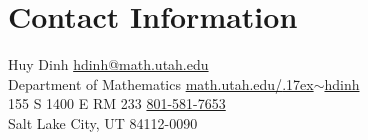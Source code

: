 \section{\sc Contact Information}
Huy Dinh      \hfill \href{mailto:hdinh@math.utah.edu}{hdinh@math.utah.edu}\\
Department of Mathematics   \hfill \href{http://www.math.utah.edu/~hdinh/}{math.utah.edu/{\raise.17ex\hbox{$\scriptstyle\sim$}}hdinh}\\
155 S 1400 E RM 233  \hfill \href{tel:801-581-7653}{801-581-7653}\\
Salt Lake City, UT 84112-0090 


